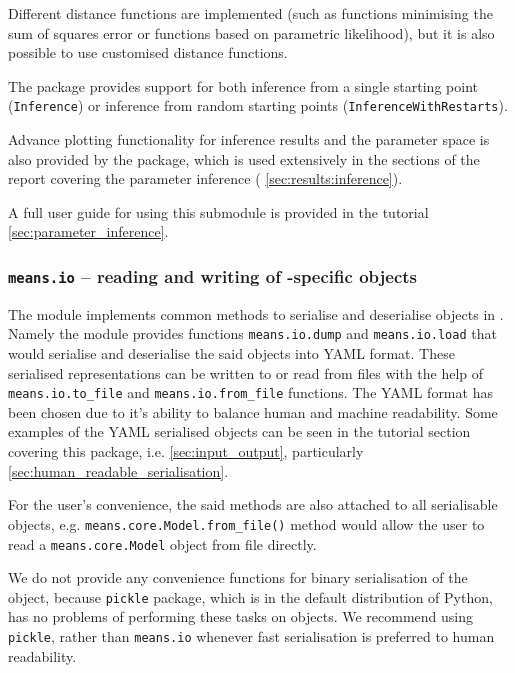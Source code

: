 Different distance functions are implemented (such as functions minimising the sum of squares error
or functions based on parametric likelihood), but it is also possible to use customised distance functions.

The package provides support for both inference from a single starting point (\verb"Inference")
or inference from random starting points (\verb"InferenceWithRestarts").

Advance plotting functionality for inference results and the parameter space is also provided by the package, which is used extensively in the sections of the report covering the parameter inference (\eg{} \autoref{sec:results:inference}). 

A full user guide for using this submodule is provided in the tutorial \autoref{sec:parameter_inference}.

\subsubsection{{\tt means.io} -- reading and writing of \means-specific objects}
The module implements common methods to serialise and deserialise objects in \means.
Namely the module provides functions \verb`means.io.dump` and  \verb`means.io.load` that would
serialise and deserialise the said objects into YAML format\cite{_official_????}.
These serialised representations can be written to or read from files with the help of
\verb`means.io.to_file` and \verb`means.io.from_file` functions.
The YAML format has been chosen due to it's ability to balance human and machine readability. 
Some examples of the YAML serialised objects can be seen in the tutorial section covering this package, i.e. \autoref{sec:input_output}, particularly \autoref{sec:human_readable_serialisation}.

For the user's convenience, the said methods are also attached to all serialisable objects,
e.g. \verb`means.core.Model.from_file()` method would allow the user to read a \verb`means.core.Model` object from file directly.

We do not provide any convenience functions for binary serialisation of the object, because \verb`pickle` package,
which is in the default distribution of Python, has no problems of performing these tasks on \means{} objects. 
We recommend using \verb`pickle`, rather than \verb`means.io` whenever fast serialisation is preferred to human
readability.

